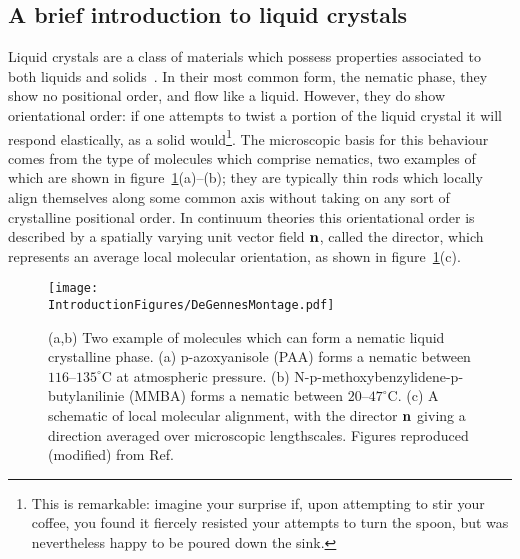 \subsection{A brief introduction to liquid crystals}

Liquid crystals are a class of materials which possess properties associated to both liquids and solids~\citep{deGennes1992}. In their most common form, the nematic phase, they show no positional order, and flow like a liquid. However, they do show orientational order: if one attempts to twist a portion of the liquid crystal it will respond elastically, as a solid would\footnote{This is remarkable: imagine your surprise if, upon attempting to stir your coffee, you found it fiercely resisted your attempts to turn the spoon, but was nevertheless happy to be poured down the sink.}. The microscopic basis for this behaviour comes from the type of molecules which comprise nematics, two examples of which are shown in figure~\ref{fig:DeGennesMontage}(a)--(b); they are typically thin rods which locally align themselves along some common axis without taking on any sort of crystalline positional order. In continuum theories this orientational order is described by a spatially varying unit vector field $\bf n$, called the director, which represents an average local molecular orientation, as shown in figure~\ref{fig:DeGennesMontage}(c).
\begin{figure}[htbp]
\centering
\texttt{[image: \\IntroductionFigures/DeGennesMontage.pdf]}
\caption{(a,b) Two example of molecules which can form a nematic liquid crystalline phase. (a) p-azoxyanisole (PAA) forms a nematic between $116$--$135^\circ$C at atmospheric pressure. (b) N-p-methoxybenzylidene-p-butylanilinie (MMBA) forms a nematic between $20$--$47^\circ$C. (c) A schematic of local molecular alignment, with the director $\bf n$ giving a direction averaged over microscopic lengthscales. Figures reproduced (modified) from Ref.~\citep{deGennes1992}}
\label{fig:DeGennesMontage}
\end{figure}

